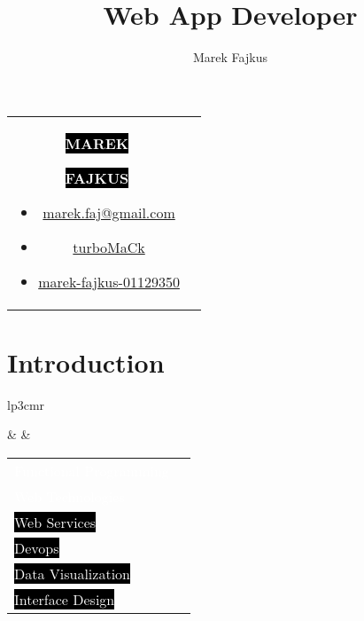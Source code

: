 \documentclass[9pt]{article}
\makeatletter
\def\faEmail{{\FAFR \symbol{"F0E0}}} %
\def\faLinkedin{\FAB \symbol{"F08C}} %
\def\faGithub{\FAB \symbol{"F09B}} %
\def\faStarEmpty{\FAFR \symbol{"F005}} %
\def\faStarFull{\FAFS \symbol{"F005}} %
\def\faStarHalf{\FAFS \symbol{"F5C0}} %
\renewcommand{\maketitle}{

  \setlength\tabcolsep{-15pt}
  \begin{tabular}{cc}
    \begin{minipage}[t]{0.65\textwidth}
      \colorbox{black}{
        {\Huge \textbf {\textcolor{white}{\MakeUppercase{Marek}}}}
      }

      \vspace{0.2cm}

      \colorbox{black}{
        {\huge \textbf {\textcolor{white}{\MakeUppercase{Fajkus}}}}
      }

      \vspace{0.4cm}

      {\large \thetitle}
    \end{minipage}

    \begin{minipage}[t]{0.35\textwidth}
      \vspace{-\baselineskip} %
      \begin{itemize}
        \itemsep0em
      \vspace{-0.5cm}
      \item \href{mailto:marek.faj@gmail.com}{
        \colorbox{ProcessBlue}{\textcolor{white}{\faEmail}} { \textcolor{ProcessBlue}{marek.faj@gmail.com}}
      }
      \item \href{https://github.com/turbomack}{
        \colorbox{black}{\textcolor{white}{\faGithub}} { turboMaCk}
      }
      \item \href{https://www.linkedin.com/in/marek-fajkus-01129350/}{
        \colorbox{black}{\textcolor{white}{\faLinkedin}} { marek-fajkus-01129350}
      }
      \end{itemize}
    \end{minipage}
  \end{tabular}

  \vspace{0.5cm}
}
\makeatother
\begin{document}
\title{Web App Developer}
\author{Marek Fajkus}
\maketitle


\section{Introduction}

\begin{tabular}{lp{3cm}r}
    \begin{minipage}[l]{0.55\textwidth}
      \blindtext
    \end{minipage}
    & &
    \begin{minipage}[r]{0.40\textwidth}
      \setlength\tabcolsep{5pt}
      \begin{tabularx}{\textwidth}{Xr}
          \colorbox{ProcessBlue}{\textcolor{white}{Functional Programming}} &
          \vspace{0.2cm}
          \textcolor{ProcessBlue}{\faStarFull \faStarFull \faStarFull \faStarEmpty \faStarEmpty} \\

          \colorbox{ProcessBlue}{\textcolor{white}{Web Technologies}} &
          \vspace{0.2cm}
          \textcolor{ProcessBlue}{\faStarFull \faStarFull \faStarFull \faStarFull \faStarEmpty} \\

          \colorbox{black}{\textcolor{white}{Web Services}} &
          \vspace{0.2cm}
          \faStarFull \faStarFull \faStarFull \faStarEmpty \faStarEmpty \\

          \colorbox{black}{\textcolor{white}{Devops}} &
          \vspace{0.2cm}
          \faStarFull \faStarFull \faStarHalf \faStarEmpty \faStarEmpty \\

          \colorbox{black}{\textcolor{white}{Data Visualization}} &
          \vspace{0.2cm}
          \faStarFull \faStarFull \faStarFull \faStarEmpty \faStarEmpty \\

          \colorbox{black}{\textcolor{white}{Interface Design}} &
          \vspace{0.2cm}
          \faStarFull \faStarFull \faStarHalf \faStarEmpty \faStarEmpty \\


\end{tabularx}
\end{minipage}
\end{tabular}
\end{document}
